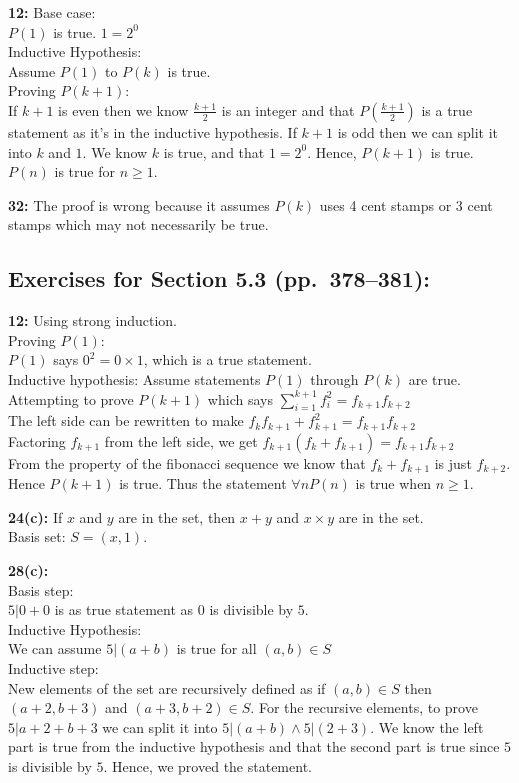 \documentclass[12pt]{article}  %
\begin{document}
\noindent
{\bf 12:}
Base case:\\ 
$P(1)$ is true. $1 = 2^0$
\\
Inductive Hypothesis:\\
Assume $P(1)$ to $P(k)$ is true.
\\
Proving $P(k + 1)$:\\
If $k + 1$ is even then we know $\frac{k+1}{2}$ is an integer and that
$P(\frac{k + 1}{2})$ is a true statement as it's in the inductive 
hypothesis. If $k + 1$ is odd then we can split it into $k$ and $1$.
We know $k$ is true, and that $1 = 2^0$. Hence, $P(k + 1)$ is true.
$P(n)$ is true for $n \geq 1$.

\noindent
{\bf 32:} The proof is wrong because it assumes $P(k)$ uses 4 cent stamps or 
3 cent stamps which may not necessarily be true.


\subsection*{Exercises for Section 5.3 (pp.\ 378--381):}

\noindent
{\bf 12:}
Using strong induction.
\\
Proving $P(1)$:
\\
$P(1)$ says $0^2 = 0 \times 1$, which is a true statement.
\\
Inductive hypothesis:
Assume statements $P(1)$ through $P(k)$ are true.
\\
Attempting to prove $P(k+1)$ which says $\sum\limits_{i=1}^{k+1} f_{i}^2 = f_{k + 1}f_{k+2}$
\\
The left side can be rewritten to make $f_{k}f_{k+1} + f_{k + 1}^2 = f_{k + 1}f_{k+2}$
\\
Factoring $f_{k+1}$ from the left side, we get $f_{k+1}(f_{k} + f_{k + 1}) = f_{k + 1}f_{k+2}$
\\
From the property of the fibonacci sequence we know that $f_{k} + f_{k + 1}$ is 
just $f_{k + 2}$. Hence $P(k + 1)$ is true. Thus the statement 
$\forall n P(n)$ is true when  $n \geq 1$.


\noindent
{\bf 24(c):}
If $x$ and $y$ are in the set, then $x + y$ and $x \times y$ are in the set.
\\
Basis set: $S = (x, 1)$.

\noindent
{\bf 28(c):}
\\
Basis step:
\\
$5 | 0 + 0$ is as true statement as $0$ is divisible by $5$.
\\
Inductive Hypothesis:
\\
We can assume $5 | (a + b)$ is true for all $(a, b) \in S$
\\
Inductive step:
\\
New elements of the set are recursively defined as 
if $(a, b) \in S$ then $(a + 2, b + 3)$ and $(a + 3, b + 2) \in S$.
For the recursive elements, to prove $5 | a + 2 + b + 3$ we can split it into
$5 | (a + b) \wedge 5 | (2 + 3)$. We know the left part is true from the 
inductive hypothesis and that the second part is true since $5$ is divisible by 
$5$. Hence, we proved the statement.
\end{document}

